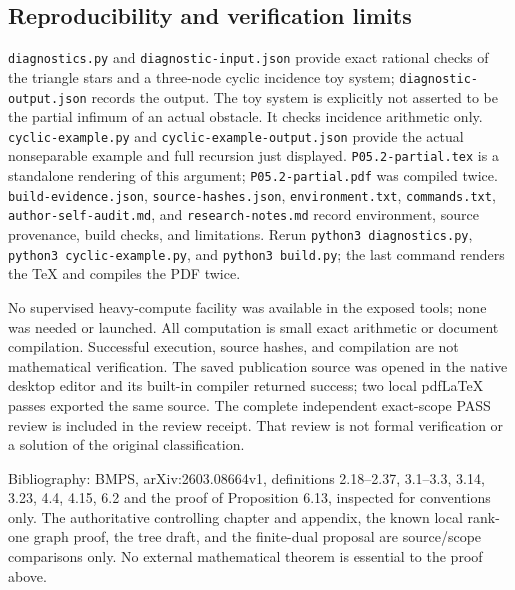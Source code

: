 \documentclass[
  11pt,
]{article}
\begin{document}
\subsection{Reproducibility and verification
limits}\label{reproducibility-and-verification-limits}

\texttt{diagnostics.py} and \texttt{diagnostic-input.json} provide exact
rational checks of the triangle stars and a three-node cyclic incidence
toy system; \texttt{diagnostic-output.json} records the output. The toy
system is explicitly not asserted to be the partial infimum of an actual
obstacle. It checks incidence arithmetic only.
\texttt{cyclic-example.py} and \texttt{cyclic-example-output.json}
provide the actual nonseparable example and full recursion just
displayed. \texttt{P05.2-partial.tex} is a standalone rendering of this
argument; \texttt{P05.2-partial.pdf} was compiled twice.
\texttt{build-evidence.json}, \texttt{source-hashes.json},
\texttt{environment.txt}, \texttt{commands.txt},
\texttt{author-self-audit.md}, and \texttt{research-notes.md} record
environment, source provenance, build checks, and limitations. Rerun
\texttt{python3\ diagnostics.py}, \texttt{python3\ cyclic-example.py},
and \texttt{python3\ build.py}; the last command renders the TeX and
compiles the PDF twice.

No supervised heavy-compute facility was available in the exposed tools;
none was needed or launched. All computation is small exact arithmetic
or document compilation. Successful execution, source hashes, and
compilation are not mathematical verification. The saved publication
source was opened in the native desktop editor and its built-in compiler
returned success; two local pdfLaTeX passes exported the same source.
The complete independent exact-scope PASS review is included in the
review receipt. That review is not formal verification or a solution of
the original classification.

Bibliography: BMPS, arXiv:2603.08664v1, definitions 2.18--2.37,
3.1--3.3, 3.14, 3.23, 4.4, 4.15, 6.2 and the proof of Proposition 6.13,
inspected for conventions only. The authoritative controlling chapter
and appendix, the known local rank-one graph proof, the tree draft, and
the finite-dual proposal are source/scope comparisons only. No external
mathematical theorem is essential to the proof above.
\end{document}

